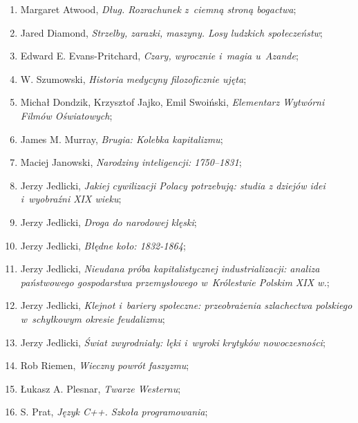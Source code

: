 \documentclass[a4paper,11pt]{article}
\begin{document}
\begin{enumerate}
\item Margaret Atwood, \textit{Dług. Rozrachunek z~ciemną stroną
    bogactwa};

\item Jared Diamond, \textit{Strzelby, zarazki, maszyny. Losy ludzkich
    społeczeństw};

\item Edward E. Evans-Pritchard, \textit{Czary, wyrocznie i~magia
    u~Azande};

\item W. Szumowski, \textit{Historia medycyny filozoficznie ujęta};

\item Michał Dondzik, Krzysztof Jajko, Emil Swoiński, \textit{Elementarz
    Wytwórni Filmów Oświatowych};

\item James M. Murray, \textit{Brugia: Kolebka kapitalizmu};

\item Maciej Janowski, \textit{Narodziny inteligencji: 1750--1831};

\item Jerzy Jedlicki, \textit{Jakiej cywilizacji Polacy potrzebują:
    studia z dziejów idei i~wyobraźni XIX wieku};

\item Jerzy Jedlicki, \textit{Droga do narodowej klęski};

\item Jerzy Jedlicki, \textit{Błędne koło: 1832-1864};

\item Jerzy Jedlicki, \textit{Nieudana próba kapitalistycznej
    industrializacji: analiza państwowego gospodarstwa przemysłowego
    w~Królestwie Polskim XIX w.};

\item Jerzy Jedlicki, \textit{Klejnot i~bariery społeczne: przeobrażenia
    szlachectwa polskiego w~schyłkowym okresie feudalizmu};

\item Jerzy Jedlicki, \textit{Świat zwyrodniały: lęki i~wyroki krytyków
    nowoczesności};

\item Rob Riemen, \textit{Wieczny powrót faszyzmu};

\item Łukasz A. Plesnar, \textit{Twarze Westernu};

\item S. Prat, \textit{Język C++. Szkoła programowania};


\end{enumerate}
\end{document}
